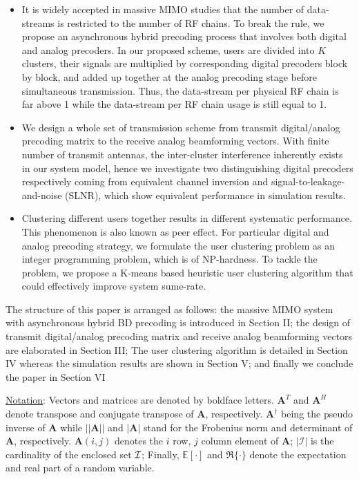 \documentclass[conference]{IEEEtran}
\begin{document}
\begin{itemize}
	\item It is widely accepted in massive MIMO studies that the number of data-streams is restricted to the number of RF chains. To break the rule, we propose an asynchronous hybrid precoding process that involves both digital and analog precoders. In our proposed scheme, users are divided into $K$ clusters, their signals are multiplied by corresponding digital precoders block by block, and added up together at the analog precoding stage before simultaneous transmission. Thus, the data-stream per physical RF chain is far above 1 while the data-stream per RF chain usage is still equal to 1.
	\item We design a whole set of transmission scheme from transmit digital/analog precoding matrix to the receive analog beamforming vectors. With finite number of transmit antennas, the inter-cluster interference inherently exists in our system model, hence we investigate two distinguishing digital precoders respectively coming from equivalent channel inversion and signal-to-leakage-and-noise (SLNR), which show equivalent performance in simulation results.
	\item Clustering different users together results in different systematic performance. This phenomenon is also known as peer effect. For particular digital and analog precoding strategy, we formulate the user clustering problem as an integer programming problem, which is of NP-hardness. To tackle the problem, we propose a K-means based heuristic user clustering algorithm that could effectively improve system sume-rate.
\end{itemize}



The structure of this paper is arranged as follows: the massive MIMO system with asynchronous hybrid BD precoding is introduced in Section II; the design of transmit digital/analog precoding matrix and receive analog beamforming vectors are elaborated in Section III; The user clustering algorithm is detailed in Section IV whereas the simulation results are shown in Section V; and finally we conclude the paper in Section VI

\underline{Notation}: Vectors and matrices are denoted by boldface letters. ${\bm A}^T$ and ${\bm A}^H$ denote transpose and conjugate transpose of ${\bm A}$, respectively. $\bm{A}^\dagger$ being the pseudo inverse of $\bm{A}$ while $||\bm{A}|| $ and $|\bm{A}|$ stand for the Frobenius norm and determinant of ${\bm A}$, respectively. $\bm{A}(i,j)$ denotes the $i$ row, $j$ column element of ${\bm A}$; $|\mathcal{I}|$ is the cardinality of the enclosed set ${\cal I}$; Finally, $\mathbb{E}[\cdot] $ and $\Re\{\cdot\}$ denote the expectation and real part of a random variable.
\end{document}
